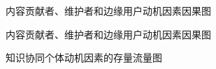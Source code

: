 \documentclass[slidestop,compress,mathserif,table]{beamer}
\begin{document}
   \begin{frame}{内容贡献者、维护者和边缘用户动机因素因果图}
   \end{frame}

   \begin{frame}{内容贡献者、维护者和边缘用户动机因素因果图}
   \end{frame}

   \begin{frame}{知识协同个体动机因素的存量流量图}
   \end{frame}
\end{document}
